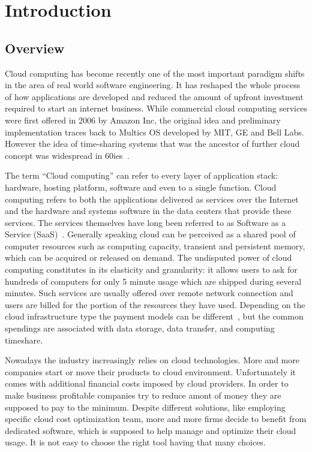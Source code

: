 \documentclass[licencjacka,en]{thesisclass}
\begin{document}
    \chapter{Introduction}


    \section{Overview}

    Cloud computing has become recently one of the most important paradigm shifts in the area of real world software engineering.
    It has reshaped the whole process of how applications are developed and reduced the amount of upfront
    investment required to start an internet business.
    While commercial cloud computing services were first offered
    in 2006 by Amazon Inc, the original idea and preliminary implementation traces back to Multics OS developed by MIT,
    GE and Bell Labs.
    However the idea of time-sharing systems that was the ancestor of further cloud
    concept was widespread in 60ies~\cite{Markus}.

    The term “Cloud computing” can refer to every layer of application stack:
    hardware, hosting platform, software and even to a single function.
    Cloud computing refers to both the applications delivered as services over the Internet and
    the hardware and systems software in the data centers that provide these services.
    The services themselves have long been referred to as Software as a Service (SaaS)~\cite{Armbrust}.
    Generally speaking cloud can be perceived as a shared pool of computer resources such as computing capacity,
    transient and persistent memory, which can be acquired or released on demand.
    The undisputed power of cloud computing constitutes in its elasticity and granularity: it allows users to ask for hundreds of computers for only 5 minute usage which
    are shipped during several minutes.
    Such services are usually offered over remote network connection and users are billed
    for the portion of the resources they have used.
    Depending on the cloud infrastructure type the payment models can be different~\cite{Laatikainen},
    but the common spendings are associated with data storage, data transfer, and computing timeshare.

    Nowadays the industry increasingly relies on cloud technologies.
    More and more companies start or move their products to cloud environment.
    Unfortunately it comes with additional financial costs imposed by cloud providers.
    In order to make business profitable companies try to reduce amont of money they are supposed to pay to the minimum.
    Despite different solutions, like employing specific cloud cost optimization team, more and more firms decide to benefit from dedicated software, which is supposed to help manage and optimize their cloud usage.
    It is not easy to choose the right tool having that many choices.
\end{document}
